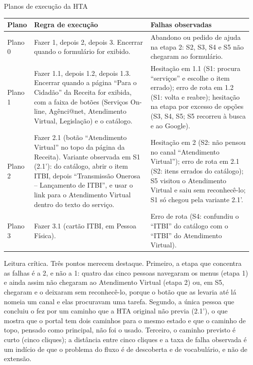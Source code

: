 \documentclass[
  12pt,
  oneside,
  a4paper,
  chapter=TITLE,
  section=TITLE,
  english,
  brazilian
]{abntex2}
\renewcommand{\fonte}[1]{\par\vspace{3pt}{\footnotesize\raggedright\noindent Fonte: #1\par}\vspace{4pt}}%
\renewcommand{\nota}[1]{\par\vspace{2pt}{\footnotesize\raggedright\noindent Nota: #1\par}\vspace{4pt}}%
\begin{document}
\begin{quadro}[!htbp]
  \caption{Planos de execução da HTA}\label{qua:planos}
  \centering\small
  \begin{tabularx}{\textwidth}{|l|Y|Y|}\hline
    Plano & Regra de execução & Falhas observadas \\\hline
    Plano 0 & Fazer 1, depois 2, depois 3. Encerrar quando o formulário for exibido. & Abandono ou pedido de ajuda na etapa 2: S2, S3, S4 e S5 não chegaram ao formulário. \\\hline
    Plano 1 & Fazer 1.1, depois 1.2, depois 1.3. Encerrar quando a página ``Para o Cidadão'' da Receita for exibida, com a faixa de botões (Serviços On-line, Agênci@net, Atendimento Virtual, Legislação) e o catálogo. & Hesitação em 1.1 (S1: procura ``serviços'' e escolhe o item errado); erro de rota em 1.2 (S1: volta e reabre); hesitação na etapa por excesso de opções (S3, S4, S5; S5 recorreu à busca e ao Google). \\\hline
    Plano 2 & Fazer 2.1 (botão ``Atendimento Virtual'' no topo da página da Receita). Variante observada em S1 (2.1'): do catálogo, abrir o item ITBI, depois ``Transmissão Onerosa -- Lançamento de ITBI'', e usar o link para o Atendimento Virtual dentro do texto do serviço. & Hesitação em 2 (S2: não pensou no canal ``Atendimento Virtual''); erro de rota em 2.1 (S2: itens errados do catálogo); S5 visitou o Atendimento Virtual e saiu sem reconhecê-lo; S1 só chegou pela variante 2.1'. \\\hline
    Plano 3 & Fazer 3.1 (cartão ITBI, em Pessoa Física). & Erro de rota (S4: confundiu o ``ITBI'' do catálogo com o ``ITBI'' do Atendimento Virtual). \\\hline
  \end{tabularx}
  \fonte{Elaborado pelos autores (2026).}
  \nota{O Plano 1 da primeira versão da HTA encerrava com ``o site da Secretaria de Economia exibido'', o que é satisfeito já no ponto de partida. Corrigiu-se para um estado observável distinto: a página da Receita com a faixa de botões visível.}
\end{quadro}

Leitura crítica. Três pontos merecem destaque. Primeiro, a etapa que
concentra as falhas é a 2, e não a 1: quatro das cinco pessoas navegaram os menus (etapa 1) e ainda assim não chegaram ao Atendimento Virtual (etapa 2) ou, em S5, chegaram e o deixaram sem reconhecê-lo, porque o
botão que as levaria até lá nomeia um canal e elas procuravam uma
tarefa. Segundo, a única pessoa que concluiu o fez por um caminho que a
HTA original não previa (2.1'), o que mostra que o portal tem dois caminhos para
o mesmo estado e que o caminho de topo, pensado como principal, não foi o
usado. Terceiro, o caminho previsto é curto (cinco cliques); a distância entre
cinco cliques e a taxa de falha observada é um indício de que o problema do
fluxo é de descoberta e de vocabulário, e não de extensão.
\end{document}
